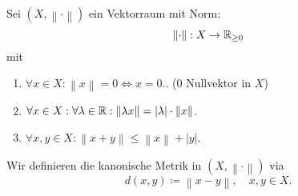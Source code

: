 \begin{subexample}
	Sei $ (X, \left\| \cdot  \right\| ) $ ein Vektorraum mit Norm:
	\[
		\left\| \cdot  \right\| : X \to \mathbb{R} _{\geq 0} 
	\]
	mit 
	\begin{enumerate}[label=(N\arabic*)]
		\item $ \forall x \in X : \left\| x \right\| = 0 \iff  x = 0. $. (0 Nullvektor in $ X $)
		\item $ \forall x \in X : \forall \lambda \in \mathbb{R} : \left\| \lambda x \right\| = \left| \lambda \right| \cdot \left\| x \right\|  $.
		\item $ \forall x, y \in X : \left\| x + y \right\| \leq \left\| x \right\| + \left| y \right|  $.
	\end{enumerate}
	Wir definieren die kanonische Metrik in $ (X, \left\| \cdot  \right\| ) $ via
	\[
		d(x, y) \coloneqq \left\| x - y \right\| , \quad x, y \in X.
	\]
	
\end{subexample}

